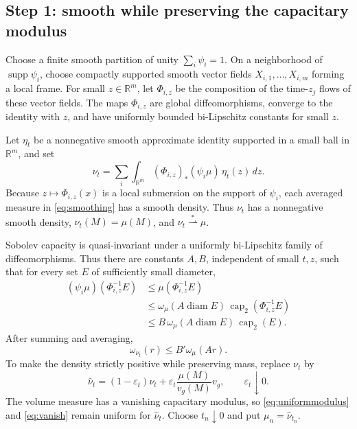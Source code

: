 \documentclass[11pt]{article}
\newcommand{\capc}{\operatorname{cap}_2}
\newcommand{\diam}{\operatorname{diam}}
\begin{document}
\subsection*{Step 1: smooth while preserving the capacitary modulus}

Choose a finite smooth partition of unity \(\sum_i\psi_i=1\). On a
neighborhood of \(\operatorname{supp}\psi_i\), choose compactly supported
smooth vector fields \(X_{i,1},\ldots,X_{i,m}\) forming a local frame. For
small \(z\in\mathbb R^m\), let \(\Phi_{i,z}\) be the composition of the
time-\(z_j\) flows of these vector fields. The maps \(\Phi_{i,z}\) are global
diffeomorphisms, converge to the identity with \(z\), and have uniformly
bounded bi-Lipschitz constants for small \(z\).

Let \(\eta_t\) be a nonnegative smooth approximate identity supported in a
small ball in \(\mathbb R^m\), and set
\begin{equation}\label{eq:smoothing}
 \nu_t=\sum_i\int_{\mathbb R^m}
       (\Phi_{i,z})_*(\psi_i\mu)\,\eta_t(z)\,dz.
\end{equation}
Because \(z\mapsto\Phi_{i,z}(x)\) is a local submersion on the support of
\(\psi_i\), each averaged measure in \eqref{eq:smoothing} has a smooth
density. Thus \(\nu_t\) has a nonnegative smooth density,
\(\nu_t(M)=\mu(M)\), and \(\nu_t\stackrel{*}{\rightharpoonup}\mu\).

Sobolev capacity is quasi-invariant under a uniformly bi-Lipschitz family of
diffeomorphisms. Thus there are constants \(A,B\), independent of small
\(t,z\), such that for every set \(E\) of sufficiently small diameter,
\begin{align*}
 (\psi_i\mu)(\Phi_{i,z}^{-1}E)
 &\leq \mu(\Phi_{i,z}^{-1}E)\\
 &\leq \omega_\mu(A\diam E)\,
        \capc(\Phi_{i,z}^{-1}E)\\
 &\leq B\,\omega_\mu(A\diam E)\,\capc(E).
\end{align*}
After summing and averaging,
\begin{equation}\label{eq:uniformmodulus}
 \omega_{\nu_t}(r)\leq B'\omega_\mu(Ar).
\end{equation}
To make the density strictly positive while preserving mass, replace
\(\nu_t\) by
\[
 \widehat\nu_t=(1-\varepsilon_t)\nu_t
   +\varepsilon_t\frac{\mu(M)}{v_g(M)}v_g,
 \qquad \varepsilon_t\downarrow0.
\]
The volume measure has a vanishing capacitary modulus, so
\eqref{eq:uniformmodulus} and \eqref{eq:vanish} remain uniform for
\(\widehat\nu_t\). Choose \(t_n\downarrow0\) and put
\(\mu_n=\widehat\nu_{t_n}\).
\end{document}
